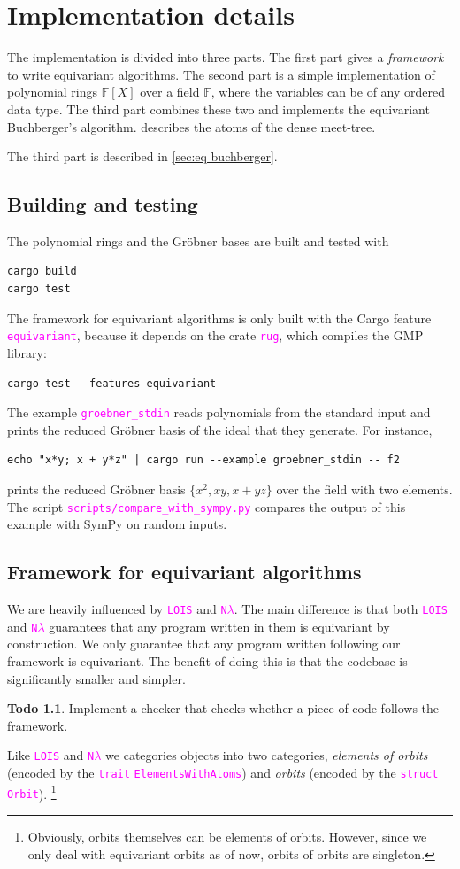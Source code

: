 \documentclass[12pt,a4paper,article]{memoir}
\newcommand{\F}{\mathbb{F}}
\newcommand{\poly}[2]{#1[#2]}
\newcommand{\arka}[1]{}
\newcommand{\emphdef}[1]{\emph{\textcolor{BrickRed}{#1}}}
\newcommand{\code}[1]{\texttt{\textcolor{magenta}{#1}}}
\theoremstyle{definition}
\newtheorem{todo}[theorem]{Todo}
\begin{document}
\chapter{Implementation details}\label{sec:impl}
%
The implementation is divided into three parts.
The first part gives a \emph{framework} to write equivariant algorithms.
The second part is a simple implementation of polynomial rings $\poly{\F}{X}$ over a field $\F$,
where the variables can be of any ordered data type.
The third part combines these two and implements the equivariant Buchberger's algorithm.
 describes the atoms of the dense meet-tree.

The third part is described in \cref{sec:eq buchberger}.
%
\section{Building and testing}
%
The polynomial rings and the Gr\"{o}bner bases are built and tested with
\begin{verbatim}
cargo build
cargo test
\end{verbatim}
The framework for equivariant algorithms is only built with the Cargo feature \code{equivariant},
because it depends on the crate \code{rug}, which compiles the GMP library:
\begin{verbatim}
cargo test --features equivariant
\end{verbatim}
The example \code{groebner\_stdin} reads polynomials from the standard input
and prints the reduced Gr\"{o}bner basis of the ideal that they generate.
For instance,
\begin{verbatim}
echo "x*y; x + y*z" | cargo run --example groebner_stdin -- f2
\end{verbatim}
prints the reduced Gr\"{o}bner basis $\{x^2, xy, x + yz\}$ over the field with two elements.
The script \code{scripts/compare\_with\_sympy.py} compares the output of this example with SymPy on random inputs.
%
\section{Framework for equivariant algorithms}
%
We are heavily influenced by \code{LOIS} and \code{N$\lambda$}.
The main difference is that both \code{LOIS} and \code{N$\lambda$} guarantees that any program written in them is equivariant by construction.
We only guarantee that any program written following our framework is equivariant.
The benefit of doing this is that the codebase is significantly smaller and simpler.
\begin{todo}
Implement a checker that checks whether a piece of code follows the framework.
\end{todo}
%
Like \code{LOIS} and \code{N$\lambda$} we categories objects into two categories,
\emphdef{elements of orbits} (encoded by the \code{trait} \code{ElementsWithAtoms}) and \emphdef{orbits} (encoded by the \code{struct} \code{Orbit}).
\footnote{Obviously, orbits themselves can be elements of orbits.
However, since we only deal with equivariant orbits as of now,
orbits of orbits are singleton.
\arka{This is schizophrenic}}
%
\end{document}
